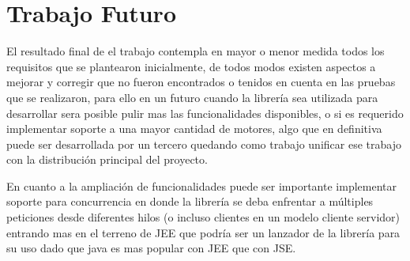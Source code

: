 \chapter*{Trabajo Futuro}
El resultado final de el trabajo contempla en mayor o menor medida todos los requisitos que se plantearon inicialmente, de todos modos existen aspectos a mejorar y corregir que no fueron encontrados o tenidos en cuenta en las pruebas que se realizaron, para ello en un futuro cuando la librería sea utilizada para desarrollar sera posible pulir mas las funcionalidades disponibles, o si es requerido implementar soporte a una mayor cantidad de motores, algo que en definitiva puede ser desarrollada por un tercero quedando como trabajo unificar ese trabajo con la distribución principal del proyecto.

En cuanto a la ampliación de funcionalidades puede ser importante implementar soporte para concurrencia en donde la librería se deba enfrentar a múltiples peticiones desde diferentes hilos (o incluso clientes en un modelo cliente servidor) entrando mas en el terreno de JEE que podría ser un lanzador de la librería para su uso dado que java es mas popular con JEE que con JSE.
